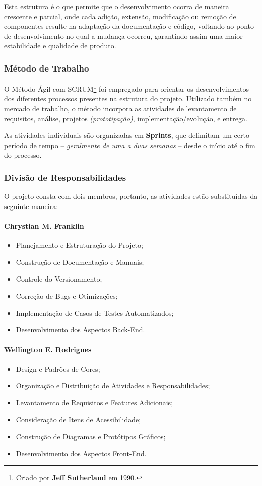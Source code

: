 \documentclass[a4paper,12pt]{article}
\begin{document}
Esta estrutura é o que permite que o desenvolvimento ocorra de maneira crescente e parcial, onde cada adição, extensão, modificação ou remoção de componentes resulte na adaptação da documentação e código, voltando ao ponto de desenvolvimento no qual a mudança ocorreu, garantindo assim uma maior estabilidade e qualidade de produto.

\subsubsection{Método de Trabalho}
O Método Ágil com SCRUM\footnote{
    Criado por \textbf{Jeff Sutherland} em 1990.
} foi empregado para orientar os desenvolvimentos dos diferentes processos presentes na estrutura do projeto. Utilizado também no mercado de trabalho, o método incorpora as atividades de levantamento de requisitos, análise, projetos \textit{(prototipação)}, implementação/evolução, e entrega.

As atividades individuais são organizadas em \textbf{Sprints}, que delimitam um certo período de tempo -- \textit{geralmente de uma a duas semanas} -- desde o início até o fim do processo.

\subsubsection{Divisão de Responsabilidades}
O projeto consta com dois membros, portanto, as atividades estão substituídas da seguinte maneira:

\paragraph{Chrystian M. Franklin}
\begin{itemize}
    \item Planejamento e Estruturação do Projeto;
    \item Construção de Documentação e Manuais;
    \item Controle do Versionamento;
    \item Correção de Bugs e Otimizações;
    \item Implementação de Casos de Testes Automatizados;
    \item Desenvolvimento dos Aspectos Back-End.
\end{itemize}

\paragraph{Wellington E. Rodrigues}
\begin{itemize}
    \item Design e Padrões de Cores;
    \item Organização e Distribuição de Atividades e Responsabilidades;
    \item Levantamento de Requisitos e Features Adicionais;
    \item Consideração de Itens de Acessibilidade;
    \item Construção de Diagramas e Protótipos Gráficos;
    \item Desenvolvimento dos Aspectos Front-End.
\end{itemize}
\end{document}
